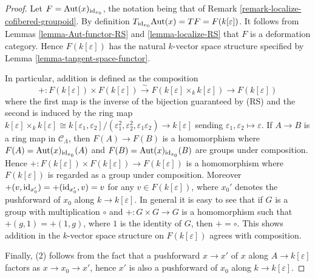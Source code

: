 \begin{proof}
Let $F = \textnormal{Aut}(x)_{\textnormal{id}_{x_0}}$, the notation being that 
of Remark \ref{remark-localize-cofibered-groupoid}. By definition 
$T_{\textnormal{id}_{x_0}} \textnormal{Aut}(x) = TF = F(k[\varepsilon])$. It 
follows from Lemmas \ref{lemma-Aut-functor-RS} and \ref{lemma-localize-RS} that 
$F$ is a deformation category.  Hence $F(k[\varepsilon])$ has the natural 
$k$-vector space structure specified by Lemma 
\ref{lemma-tangent-space-functor}.  

\medskip \noindent
In particular, addition is defined as the composition
\[ +: F(k[\varepsilon]) \times F(k[\varepsilon]) \xrightarrow{\sim} 
F(k[\varepsilon] \times_{k} k[\varepsilon]) \rightarrow F(k[\varepsilon]) \]
where the first map is the inverse of the bijection guaranteed by (RS) and the 
second is induced by the ring map $k[\varepsilon] \times_{k} k[\varepsilon] 
\cong k[\varepsilon_1,\varepsilon_2]/(\varepsilon_1^2, \varepsilon_2^2, 
\varepsilon_1\varepsilon_2) \rightarrow k[\varepsilon]$ sending 
$\varepsilon_1,\varepsilon_2 \mapsto \varepsilon$. If $A \rightarrow B$ is a 
ring map in $\mathcal C_{\Lambda}$, then $F(A) \rightarrow F(B)$ is a 
homomorphism where $F(A) = \textnormal{Aut}(x)_{\textnormal{id}_{x_0}}(A)$ and 
$F(B) = \textnormal{Aut}(x)_{\textnormal{id}_{x_0}}(B)$ are groups under 
composition.  Hence $+: F(k[\varepsilon]) \times F(k[\varepsilon])\rightarrow 
F(k[\varepsilon])$ is a homomorphism where $F(k[\varepsilon])$ is regarded as a 
group under composition.  Moreover $+(v, \textnormal{id}_{x_0'}) = 
+(\textnormal{id}_{x_0'},v) = v$ for any $v \in F(k[\varepsilon])$, where 
$x_0'$ denotes the pushforward of $x_0$ along $k \rightarrow k[\varepsilon]$.  
In general it is easy to see that if $G$ is a group with multiplication $\circ$ 
and $+: G \times G \rightarrow G$ is a homomorphism such that $+(g,1) = 
+(1,g)$, where $1$ is the identity of $G$, then $+ = \circ$.  This shows 
addition in the $k$-vector space structure on $F(k[\varepsilon])$ agrees with 
composition.

\medskip \noindent
Finally, (2) follows from the fact that a pushforward $x \rightarrow x'$ of $x$ 
along $A \rightarrow k[\varepsilon]$ factors as $x \rightarrow x_0 \rightarrow 
x'$, hence $x'$ is also a pushforward of $x_0$ along $k \rightarrow 
k[\varepsilon]$.
\end{proof}

